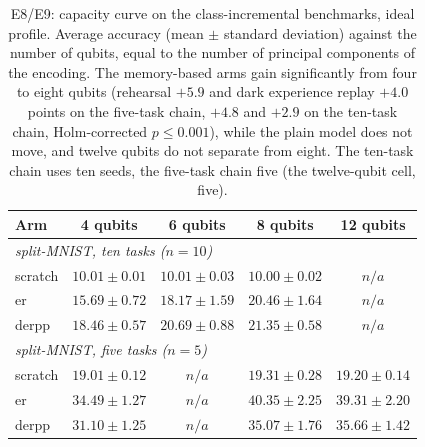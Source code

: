\begin{table}[ht]
\centering
\small
\setlength{\tabcolsep}{4pt}
\caption{E8/E9: capacity curve on the class-incremental benchmarks, ideal profile. Average accuracy (mean $\pm$ standard deviation) against the number of qubits, equal to the number of principal components of the encoding. The memory-based arms gain significantly from four to eight qubits (rehearsal $+5.9$ and dark experience replay $+4.0$ points on the five-task chain, $+4.8$ and $+2.9$ on the ten-task chain, Holm-corrected $p \leq 0.001$), while the plain model does not move, and twelve qubits do not separate from eight. The ten-task chain uses ten seeds, the five-task chain five (the twelve-qubit cell, five).}
\label{tab:e89_capacity}
\begin{tabular}{lcccc}
\toprule
Arm & 4 qubits & 6 qubits & 8 qubits & 12 qubits \\
\midrule
\multicolumn{5}{l}{\textit{split-MNIST, ten tasks ($n=10$)}} \\
scratch & $10.01 \pm 0.01$ & $10.01 \pm 0.03$ & $10.00 \pm 0.02$ & $n/a$ \\
er & $15.69 \pm 0.72$ & $18.17 \pm 1.59$ & $20.46 \pm 1.64$ & $n/a$ \\
derpp & $18.46 \pm 0.57$ & $20.69 \pm 0.88$ & $21.35 \pm 0.58$ & $n/a$ \\
\midrule
\multicolumn{5}{l}{\textit{split-MNIST, five tasks ($n=5$)}} \\
scratch & $19.01 \pm 0.12$ & $n/a$ & $19.31 \pm 0.28$ & $19.20 \pm 0.14$ \\
er & $34.49 \pm 1.27$ & $n/a$ & $40.35 \pm 2.25$ & $39.31 \pm 2.20$ \\
derpp & $31.10 \pm 1.25$ & $n/a$ & $35.07 \pm 1.76$ & $35.66 \pm 1.42$ \\
\bottomrule
\end{tabular}
\end{table}
